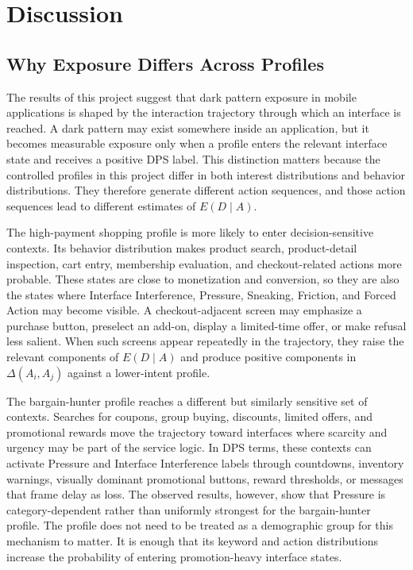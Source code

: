 \chapter{Discussion}

\section{Why Exposure Differs Across Profiles}

The results of this project suggest that dark pattern exposure in mobile applications is shaped by the interaction trajectory through which an interface is reached. A dark pattern may exist somewhere inside an application, but it becomes measurable exposure only when a profile enters the relevant interface state and receives a positive DPS label. This distinction matters because the controlled profiles in this project differ in both interest distributions and behavior distributions. They therefore generate different action sequences, and those action sequences lead to different estimates of \(E(D \mid A)\).

The high-payment shopping profile is more likely to enter decision-sensitive contexts. Its behavior distribution makes product search, product-detail inspection, cart entry, membership evaluation, and checkout-related actions more probable. These states are close to monetization and conversion, so they are also the states where Interface Interference, Pressure, Sneaking, Friction, and Forced Action may become visible. A checkout-adjacent screen may emphasize a purchase button, preselect an add-on, display a limited-time offer, or make refusal less salient. When such screens appear repeatedly in the trajectory, they raise the relevant components of \(E(D \mid A)\) and produce positive components in \(\Delta(A_i,A_j)\) against a lower-intent profile.

The bargain-hunter profile reaches a different but similarly sensitive set of contexts. Searches for coupons, group buying, discounts, limited offers, and promotional rewards move the trajectory toward interfaces where scarcity and urgency may be part of the service logic. In DPS terms, these contexts can activate Pressure and Interface Interference labels through countdowns, inventory warnings, visually dominant promotional buttons, reward thresholds, or messages that frame delay as loss. The observed results, however, show that Pressure is category-dependent rather than uniformly strongest for the bargain-hunter profile. The profile does not need to be treated as a demographic group for this mechanism to matter. It is enough that its keyword and action distributions increase the probability of entering promotion-heavy interface states.

